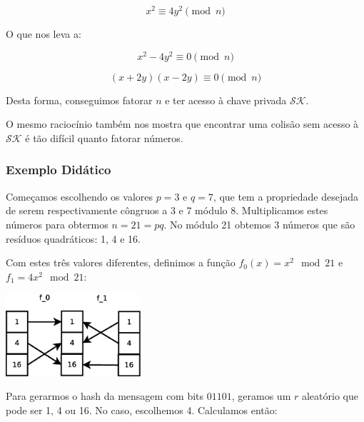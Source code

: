 \documentclass[a4paper]{article}
\begin{document}
$$
x^2 \equiv 4y^2 \pmod n
$$

O que nos leva a:

$$
x^2 - 4y^2 \equiv 0 \pmod n
$$

$$
(x+2y)(x-2y) \equiv 0 \pmod n
$$

Desta forma, conseguimos fatorar $n$ e ter acesso à chave privada
$\mathcal{SK}$.

O mesmo raciocínio também nos mostra que encontrar uma colisão sem
acesso à $\mathcal{SK}$ é tão difícil quanto fatorar números.





  

\subsubsection{Exemplo Didático}

Começamos escolhendo os valores $p=3$ e $q=7$, que tem a propriedade
desejada de serem respectivamente côngruos a 3 e 7 módulo
8. Multiplicamos estes números para obtermos $n = 21 = pq$. No módulo
21 obtemos 3 números que são resíduos quadráticos: 1, 4 e 16.

Com estes três valores diferentes, definimos a função $f_0(x)=x^2\mod
21$ e $f_1=4x^2\mod 21$:

\includegraphics[width=5cm]{imagens/toy1.eps}

Para gerarmos o hash da mensagem com bits $01101$, geramos um $r$
aleatório que pode ser 1, 4 ou 16. No caso, escolhemos 4. Calculamos
então:
\end{document}
